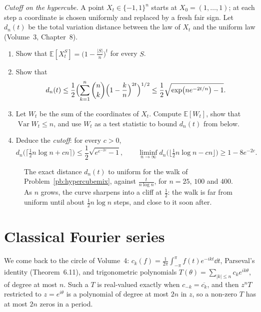 \begin{exercise}[Journey]\label{pb:hypercubemix}
\emph{Cutoff on the hypercube.} A point $X_t\in\{-1,1\}^n$ starts at $X_0=(1,\dots,1)$; at each step a coordinate is chosen uniformly
and replaced by a fresh fair sign. Let $d_n(t)$ be the total variation distance between the law of $X_t$ and the uniform law
(Volume~3, Chapter~8).
\begin{enumerate}[label=(\alph*)]
\item Show that $\mathbb E[X_t^S]=\bigl(1-\frac{|S|}n\bigr)^t$ for every $S$.
\item Show that
\[
d_n(t)\le\frac12\Bigl(\sum_{k=1}^n\binom nk\Bigl(1-\frac kn\Bigr)^{2t}\Bigr)^{1/2}\le\frac12\sqrt{\exp\bigl(ne^{-2t/n}\bigr)-1}.
\]
\item Let $W_t$ be the sum of the coordinates of $X_t$. Compute $\mathbb E[W_t]$, show that $\operatorname{Var}W_t\le n$, and use $W_t$ as a test statistic to
bound $d_n(t)$ from below.
\item Deduce the \emph{cutoff}: for every $c>0$,
\[
d_n\bigl(\bigl\lceil\tfrac12n\log n+cn\bigr\rceil\bigr)\le\frac12\sqrt{e^{e^{-2c}}-1},\qquad\liminf_{n\to\infty}d_n\bigl(\bigl\lfloor\tfrac12n\log n-cn\bigr\rfloor\bigr)\ge1-8e^{-2c}.
\]
\end{enumerate}
\end{exercise}

\begin{figure}[ht]
\centering
{}
\caption{The exact distance $d_n(t)$ to uniform for the walk of Problem~\ref{pb:hypercubemix}, against $\frac t{n\log n}$, for $n=25$,
$100$ and $400$. As $n$ grows, the curve sharpens into a cliff at $\frac12$: the walk is far from uniform until about $\frac12n\log n$
steps, and close to it soon after.}
\label{fig:cutoff}
\end{figure}

\section{Classical Fourier series}

We come back to the circle of Volume~4: $c_k(f)=\frac1{2\pi}\int_{-\pi}^\pi f(t)e^{-ikt}\dd t$, Parseval's identity (Theorem~6.11), and
trigonometric polynomials $T(\theta)=\sum_{|k|\le n}c_ke^{ik\theta}$, of degree at most $n$. Such a $T$ is real-valued exactly when $c_{-k}=\overline{c_k}$, and
then $z^nT$ restricted to $z=e^{i\theta}$ is a polynomial of degree at most $2n$ in $z$, so a non-zero $T$ has at most $2n$ zeros in a period.

